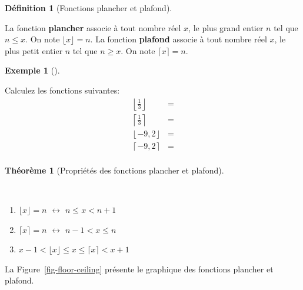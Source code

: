 \documentclass[
  letterpaper,
]{scrbook}
\providecommand{\tightlist}{%
  \setlength{\itemsep}{0pt}\setlength{\parskip}{0pt}}\usepackage{longtable,booktabs,array}
\theoremstyle{plain}
\newtheorem{theorem}{Théorème}[chapter]
\theoremstyle{definition}
\newtheorem{definition}{Définition}[chapter]
\theoremstyle{definition}
\newtheorem{example}{Exemple}[chapter]
\theoremstyle{remark}
\begin{document}
\begin{definition}[Fonctions plancher et
plafond]\protect\hypertarget{def-fonction-plancher-plafond}{}\label{def-fonction-plancher-plafond}

La fonction \textbf{plancher} associe à tout nombre réel \(x\), le plus
grand entier \(n\) tel que \(n\leq x\). On note
\(\lfloor x\rfloor = n\). La fonction \textbf{plafond} associe à tout
nombre réel \(x\), le plus petit entier \(n\) tel que \(n\geq x\). On
note \(\lceil x \rceil = n\).

\end{definition}

\begin{example}[]\protect\hypertarget{exm-fonction-plancher-et-plafond}{}\label{exm-fonction-plancher-et-plafond}

Calculez les fonctions suivantes: \begin{align*}
\left\lfloor \frac{1}{3}\right\rfloor &= \\
\left\lceil \frac{1}{3}\right\rceil &= \\
\left\lfloor -9,2\right\rfloor &= \\
\left\lceil -9,2\right\rceil &= \\
\end{align*}

\end{example}

\begin{theorem}[Propriétés des fonctions plancher et
plafond]\protect\hypertarget{thm-proprietes-plancher-plafond}{}\label{thm-proprietes-plancher-plafond}

~

\begin{enumerate}
\def\labelenumi{\arabic{enumi}.}
\tightlist
\item
  \(\lfloor x\rfloor = n\) \(\leftrightarrow\) \(n\leq x<n+1\)
\item
  \(\lceil x\rceil = n\) \(\leftrightarrow\) \(n-1< x\leq n\)
\item
  \(x-1<\lfloor x\rfloor \leq x \leq \lceil x \rceil < x+1\)
\end{enumerate}

\end{theorem}

La Figure~\ref{fig-floor-ceiling} présente le graphique des fonctions
plancher et plafond.
\end{document}
